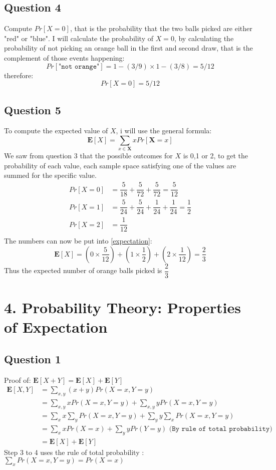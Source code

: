 \documentclass{article}
\begin{document}
\subsection{Question 4}
Compute $Pr[X = 0]$, that is the probability that the two balls picked are either "red" or "blue". I will calculate the probability of $X = 0$, by calculating the probability of not picking an orange ball in the first and second draw, that is the complement of those events happening:
$$ Pr[\texttt{"not orange"}] = 1-(3/9) \times 1-(3/8) = 5/12 $$
therefore:
$$ Pr[X=0] = 5/12 $$
\subsection{Question 5}
To compute the expected value of $X$, i will use the general formula:
\begin{equation}
\mathbf{E}[X] = \sum\limits_{x \in \mathbf{X}} x  Pr[\mathbf{X} = x]
\label{expectation}
\end{equation}
We saw from question 3 that the possible outcomes for $X$ is 0,1 or 2, to get the probability of each value, each sample space satisfying one of the values are summed for the specific value.
\begin{align*}
Pr[X=0] &= \dfrac{5}{18} + \dfrac{5}{72} + \dfrac{5}{72} = \dfrac{5}{12} \\
Pr[X=1] &= \dfrac{5}{24} + \dfrac{5}{24} + \dfrac{1}{24} + \dfrac{1}{24} = \dfrac{1}{2} \\
Pr[X=2] &= \dfrac{1}{12} \\
\end{align*}
The numbers can now be put into \eqref{expectation}:
$$
\mathbf{E}[X] = (0 \times \dfrac{5}{12}) + (1 \times \dfrac{1}{2}) + (2 \times \dfrac{1}{12}) = \dfrac{2}{3}
$$
Thus the expected number of orange balls picked is $ \dfrac{2}{3}$
\section{4. Probability Theory: Properties of Expectation }
\subsection{Question 1}
Proof of: $ \mathbf{E}[X+Y]= \mathbf{E}[X] + \mathbf{E}[Y]$
\begin{align}
\mathbf{E}[X,Y] &= \sum\limits_{x,y}(x+y)Pr(X=x,Y=y) \\
&= \sum\limits_{x,y} x Pr(X=x,Y=y) + \sum\limits_{x,y} y Pr(X=x,Y=y) \\
&= \sum\limits_{x} x \sum\limits_{y} Pr(X=x,Y=y) + \sum\limits_{y} y \sum\limits_{x}  Pr(X=x,Y=y) \\
&= \sum\limits_{x} x Pr(X=x) + \sum\limits_{y} y Pr(Y=y) \texttt{   (By rule of total probability)}\\
&= \mathbf{E}[X] + \mathbf{E}[Y]
\end{align}
Step 3 to 4 uses the rule of total probability : $ \sum\limits_{x} Pr(X=x,Y=y) = Pr(X=x) $
\end{document}
